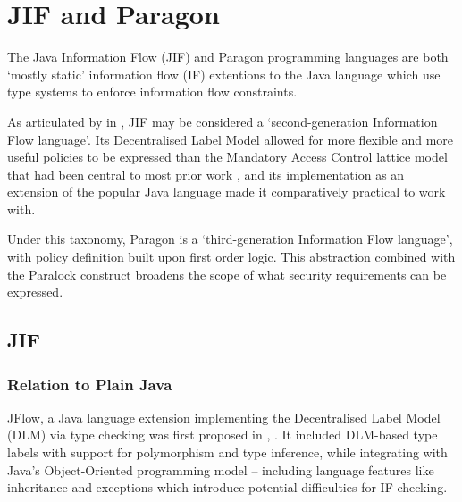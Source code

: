 \chapter{JIF and Paragon} \label{intro_to_jif_para}

The Java Information Flow (JIF) and Paragon programming languages are both `mostly static' information flow (IF) extentions to the Java language which use type systems to enforce information flow constraints.

As articulated by \citeauthor{broberg2013paragon} in  \cite{broberg2013paragon}, JIF may be considered a `second-generation Information Flow language'. Its Decentralised Label Model allowed for more flexible and more useful policies to be expressed than the Mandatory Access Control lattice model that had been central to most prior work \cite{denning1977certification}, and its implementation as an extension of the popular Java language made it comparatively practical to work with.

Under this taxonomy, Paragon is a `third-generation Information Flow language', with policy definition built upon first order logic. This abstraction combined with the Paralock construct broadens the scope of what security requirements can be expressed.


\newpage

\section{JIF}

\subsection{Relation to Plain Java}

JFlow, a Java language extension implementing the Decentralised Label Model (DLM) via type checking was first proposed in , \cite{myers1999jflow}. It included DLM-based type labels with support for polymorphism and type inference, while integrating with Java's Object-Oriented programming model -- including language features like inheritance and exceptions which introduce potential difficulties for IF checking.

